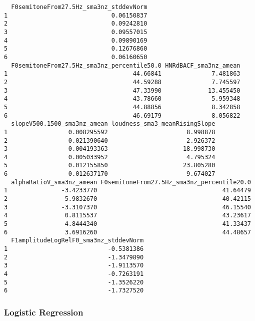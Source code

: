 \documentclass[
  letterpaper,
  DIV=11,
  numbers=noendperiod]{scrartcl}
\begin{document}
\begin{verbatim}
  F0semitoneFrom27.5Hz_sma3nz_stddevNorm
1                             0.06150837
2                             0.09242810
3                             0.09557015
4                             0.09890169
5                             0.12676860
6                             0.06160650
  F0semitoneFrom27.5Hz_sma3nz_percentile50.0 HNRdBACF_sma3nz_amean
1                                   44.66841              7.481863
2                                   44.59288              7.745597
3                                   47.33990             13.455450
4                                   43.78660              5.959348
5                                   44.88856              8.342858
6                                   46.69179              8.056822
  slopeV500.1500_sma3nz_amean loudness_sma3_meanRisingSlope
1                 0.008295592                      8.998878
2                 0.021390640                      2.926372
3                 0.004193363                     18.998730
4                 0.005033952                      4.795324
5                 0.012155850                     23.805280
6                 0.012637170                      9.674027
  alphaRatioV_sma3nz_amean F0semitoneFrom27.5Hz_sma3nz_percentile20.0
1               -3.4233770                                   41.64479
2                5.9832670                                   40.42115
3               -3.3107370                                   46.15540
4                0.8115537                                   43.23617
5                4.8444340                                   41.33437
6                3.6916260                                   44.48657
  F1amplitudeLogRelF0_sma3nz_stddevNorm
1                            -0.5381386
2                            -1.3479890
3                            -1.9113570
4                            -0.7263191
5                            -1.3526220
6                            -1.7327520
\end{verbatim}

\subsubsection{Logistic Regression}\label{logistic-regression}
\end{document}
